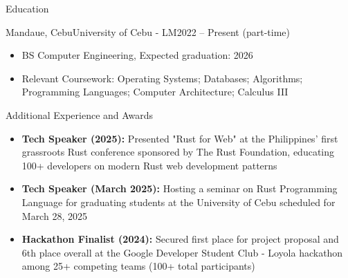 \documentclass[]{mcdowellcv}
\begin{document}
	\begin{cvsection}{Education}
		\begin{cvsubsection}{Mandaue, Cebu}{University of Cebu - LM}{2022 -- Present (part-time)}
			\begin{itemize}
				\item BS Computer Engineering, Expected graduation: 2026
				\item Relevant Coursework: Operating Systems; Databases; Algorithms; Programming Languages; Computer Architecture; Calculus III
			\end{itemize}
		\end{cvsubsection}
	\end{cvsection}
	
	\begin{cvsection}{Additional Experience and Awards}
		\begin{cvsubsection}{}{}{}	
			\begin{itemize}
				\item \textbf{Tech Speaker (2025):} Presented "Rust for Web" at the Philippines' first grassroots Rust conference sponsored by The Rust Foundation, educating 100+ developers on modern Rust web development patterns
				\item \textbf{Tech Speaker (March 2025): } Hosting a seminar on Rust Programming Language for graduating students at the University of Cebu scheduled for March 28, 2025
				\item \textbf{Hackathon Finalist (2024): } Secured first place for project proposal and 6th place overall at the Google Developer Student Club - Loyola hackathon among 25+ competing teams (100+ total participants)
			\end{itemize}
		\end{cvsubsection}
	\end{cvsection}
	
\end{document}
